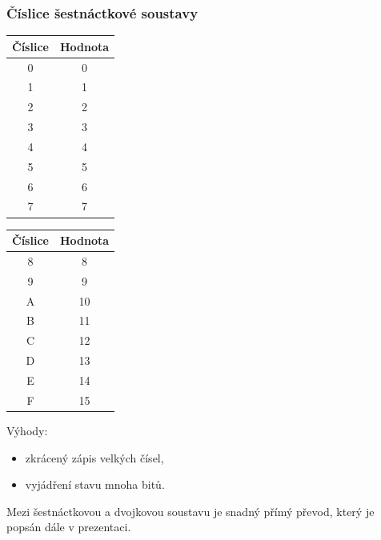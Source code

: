 	\begin{frame}
    \frametitle{Číslice šestnáctkové soustavy}
		
		\begin{minipage}[c][0.65\textheight][t]{0.3\textwidth}
			\begin{tabular}{| c | c |}
				\hline
				\textbf{Číslice} & \textbf{Hodnota} \\
				\hline
				0 & 0 \\
				\hline
				1 & 1 \\
				\hline
				2 & 2 \\
				\hline
				3 & 3 \\
				\hline
				4 & 4 \\
				\hline
				5 & 5 \\
				\hline
				6 & 6 \\
				\hline
				7 & 7 \\
				\hline
			\end{tabular}
		\end{minipage} %
		\begin{minipage}[c][0.65\textheight][t]{0.32\textwidth}
			\begin{tabular}{| c | c |}
				\hline
				\textbf{Číslice} & \textbf{Hodnota} \\
				\hline
				8 & 8 \\
				\hline
				9 & 9 \\
				\hline
				A & 10 \\
				\hline
				B & 11 \\
				\hline
				C & 12 \\
				\hline
				D & 13 \\
				\hline
				E & 14 \\
				\hline
				F & 15 \\
				\hline
			\end{tabular}
		\end{minipage} %
		\begin{minipage}[c][0.65\textheight][t]{0.28\textwidth}
			Výhody:
			\begin{itemize}
				\item zkrácený zápis velkých čísel,
				\item vyjádření stavu mnoha bitů.
			\end{itemize}
		\end{minipage}
		
		\begin{minipage}[t][0.3\textheight][t]{\textwidth}
			Mezi šestnáctkovou a dvojkovou soustavu je snadný přímý převod, který je popsán dále v prezentaci.
		\end{minipage}
	\end{frame}
  
